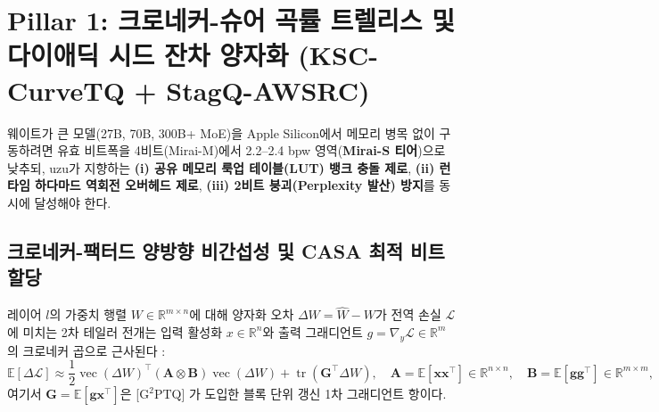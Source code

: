 \documentclass[10pt,a4paper]{article}
\begin{document}
\section{Pillar 1: 크로네커-슈어 곡률 트렐리스 및 다이애딕 시드 잔차 양자화 (KSC-CurveTQ + StagQ-AWSRC)}

웨이트가 큰 모델(27B, 70B, 300B+ MoE)을 Apple Silicon에서 메모리 병목 없이 구동하려면 유효 비트폭을 4비트(\textsf{Mirai-M})에서 2.2--2.4 bpw 영역(\textbf{\textsf{Mirai-S} 티어})으로 낮추되, \textsf{uzu}가 지향하는 \textbf{(i) 공유 메모리 룩업 테이블(LUT) 뱅크 충돌 제로}, \textbf{(ii) 런타임 하다마드 역회전 오버헤드 제로}, \textbf{(iii) 2비트 붕괴(Perplexity 발산) 방지}를 동시에 달성해야 한다.

\subsection{크로네커-팩터드 양방향 비간섭성 및 CASA 최적 비트 할당}
레이어 $l$의 가중치 행렬 $W \in \mathbb{R}^{m \times n}$에 대해 양자화 오차 $\Delta W = \widehat{W} - W$가 전역 손실 $\mathcal{L}$에 미치는 2차 테일러 전개는 입력 활성화 $x \in \mathbb{R}^n$와 출력 그래디언트 $g = \nabla_y \mathcal{L} \in \mathbb{R}^m$의 크로네커 곱으로 근사된다 \cite{lee2026kronq,yoshida2026casa}:
\begin{equation}
\mathbb{E}[\Delta \mathcal{L}] \approx \frac{1}{2} \operatorname{vec}(\Delta W)^\top \left( \mathbf{A} \otimes \mathbf{B} \right) \operatorname{vec}(\Delta W) + \operatorname{tr}\left( \mathbf{G}^\top \Delta W \right), \quad \mathbf{A} = \mathbb{E}[\mathbf{x}\mathbf{x}^\top] \in \mathbb{R}^{n \times n}, \quad \mathbf{B} = \mathbb{E}[\mathbf{g}\mathbf{g}^\top] \in \mathbb{R}^{m \times m},
\label{eq:kronecker_loss}
\end{equation}
여기서 $\mathbf{G} = \mathbb{E}[\mathbf{g}\mathbf{x}^\top]$은 [$\text{G}^2\text{PTQ}$] \cite{liu2026g2ptq}가 도입한 블록 단위 갱신 1차 그래디언트 항이다.
\end{document}
